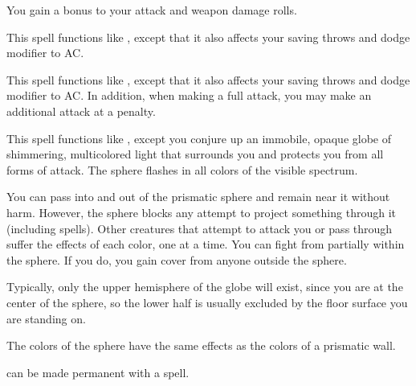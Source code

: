 \begin{spelleffect}
  You gain a  bonus to your attack and weapon damage rolls. \bonusscalingdescription
\end{spelleffect}

\begin{spelleffect}
  This spell functions like , except that it also affects your saving throws and dodge modifier to AC.
\end{spelleffect}

\begin{spelleffect}
  This spell functions like , except that it also affects your saving throws and dodge modifier to AC. In addition, when making a full attack, you may make an additional attack at a  penalty.
\end{spelleffect}

\begin{spelleffect}
  This spell functions like , except you conjure up an immobile, opaque globe of shimmering, multicolored light that surrounds you and protects you from all forms of attack. The sphere flashes in all colors of the visible spectrum. 
  \par You can pass into and out of the prismatic sphere and remain near it without harm. However, the sphere blocks any attempt to project something through it (including spells). Other creatures that attempt to attack you or pass through suffer the effects of each color, one at a time. You can fight from partially within the sphere. If you do, you gain cover from anyone outside the sphere.
  \par Typically, only the upper hemisphere of the globe will exist, since you are at the center of the sphere, so the lower half is usually excluded by the floor surface you are standing on.
  \par The colors of the sphere have the same effects as the colors of a prismatic wall.
\end{spelleffect}
\begin{spellnotes}
   can be made permanent with a  spell.
\end{spellnotes}

